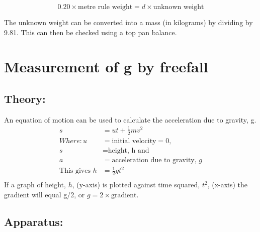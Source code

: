 \[0.20 \times \text{metre rule weight} = d \times \text{unknown weight} \]

The unknown weight can be converted into a mass (in kilograms) by dividing by 9.81. This can then be checked using a top pan balance. 
\section{Measurement of g by freefall}
\subsection{Theory:} 

An equation of motion can be used to calculate the acceleration due to gravity, g. 
\begin {align} 
s &= ut + \frac{1}{2}mv^{2} \\
    Where:  u &= \text{initial velocity} = 0,   \\    s &= \text{height, h and}  \\     a &= \text{acceleration due to gravity, } g \\ 
    \text{This gives } h &= \frac{1}{2}gt^{2}\\
    \end{align}
If a graph of height, $h$, (y-axis) is plotted against time squared, $t^{2}$, (x-axis) the gradient will equal g/2, or $g = 2\times \text{gradient}$.  
\subsection{Apparatus:}  

